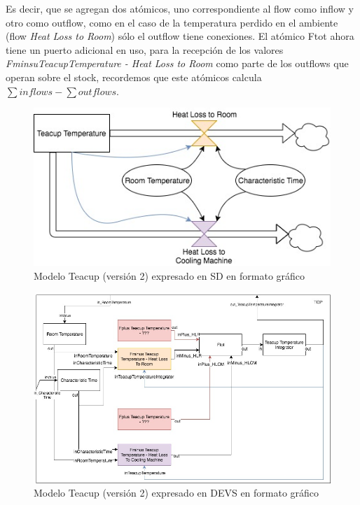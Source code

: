 Es decir, que se agregan dos atómicos, uno correspondiente al flow como inflow y otro como outflow, como en el caso de la temperatura perdido en el ambiente (flow \textit{Heat Loss to Room}) sólo el outflow tiene conexiones. El atómico Ftot ahora tiene un puerto adicional en uso, para la recepción de los valores \textit{FminsuTeacupTemperature - Heat Loss to Room} como parte de los outflows que operan sobre el stock, recordemos que este atómicos calcula $\sum inflows - \sum outflows $.


\begin{figure}[!h]
\centering
\includegraphics[scale=0.4]{imagenes/Teacup_sd_2}
\caption{Modelo Teacup (versión 2) expresado en SD en formato gráfico}
\label{fig:Teacup_sd_2}
\end{figure}

\begin{figure}[!h]
\centering
\includegraphics[scale=0.4]{imagenes/Teacup_devs_flattened_2}
\caption{Modelo Teacup (versión 2) expresado en DEVS en formato gráfico}
\label{fig:Teacup_devs_flattened_2}
\end{figure}

